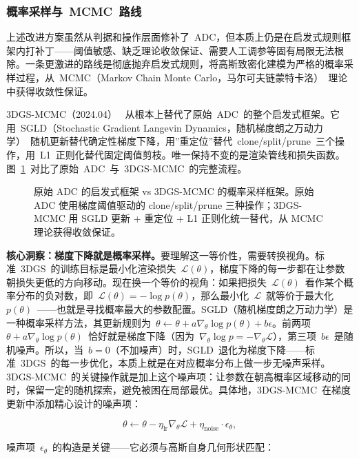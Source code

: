 \subsubsection{概率采样与~MCMC~路线}

上述改进方案虽然从判据和操作层面修补了~ADC，但本质上仍是在启发式规则框架内打补丁——阈值敏感、缺乏理论收敛保证、需要人工调参等固有局限无法根除。一条更激进的路线是彻底抛弃启发式规则，将高斯致密化建模为严格的概率采样过程，从~MCMC（Markov Chain Monte Carlo，马尔可夫链蒙特卡洛）~理论中获得收敛性保证。

3DGS-MCMC（2024.04）~\cite{2404_09591} 从根本上替代了原始~ADC~的整个启发式框架。它用~SGLD（Stochastic Gradient Langevin Dynamics，随机梯度朗之万动力学）~随机更新替代确定性梯度下降，用”重定位”替代~clone/split/prune~三个操作，用~L1~正则化替代固定阈值剪枝。唯一保持不变的是渲染管线和损失函数。图~\ref{fig:02_mcmc}~对比了原始~ADC~与~3DGS-MCMC~的完整流程。

\begin{figure}[htbp]
\centering
\resizebox{0.78\textwidth}{!}{}
\caption{原始 ADC 的启发式框架 vs 3DGS-MCMC 的概率采样框架。原始 ADC 使用梯度阈值驱动的 clone/split/prune 三种操作；3DGS-MCMC 用 SGLD 更新 + 重定位 + L1 正则化统一替代，从 MCMC 理论获得收敛保证。}
\label{fig:02_mcmc}
\end{figure}

\textbf{核心洞察：梯度下降就是概率采样。}要理解这一等价性，需要转换视角。标准~3DGS~的训练目标是最小化渲染损失~$\mathcal{L}(\theta)$，梯度下降的每一步都在让参数朝损失更低的方向移动。现在换一个等价的视角：如果把损失~$\mathcal{L}(\theta)$~看作某个概率分布的负对数，即~$\mathcal{L}(\theta) = -\log p(\theta)$，那么最小化~$\mathcal{L}$~就等价于最大化~$p(\theta)$~——也就是寻找概率最大的参数配置。SGLD（随机梯度朗之万动力学）是一种概率采样方法，其更新规则为~$\theta \leftarrow \theta + a \nabla_\theta \log p(\theta) + b \epsilon$。前两项~$\theta + a \nabla_\theta \log p(\theta)$~恰好就是梯度下降（因为~$\nabla_\theta \log p = -\nabla_\theta \mathcal{L}$），第三项~$b \epsilon$~是随机噪声。所以，当~$b=0$（不加噪声）时，SGLD~退化为梯度下降——标准~3DGS~的每一步优化，本质上就是在对应概率分布上做一步无噪声采样。3DGS-MCMC~的关键操作就是加上这个噪声项：让参数在朝高概率区域移动的同时，保留一定的随机探索，避免被困在局部最优。具体地，3DGS-MCMC~在梯度更新中添加精心设计的噪声项：

\[
\theta \leftarrow \theta - \eta_{\text{lr}} \nabla_\theta \mathcal{L} + \eta_{\text{noise}} \cdot \epsilon_\theta,
\]

噪声项~$\epsilon_\theta$~的构造是关键——它必须与高斯自身几何形状匹配：

